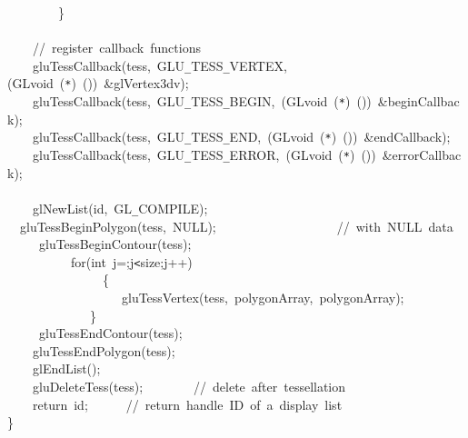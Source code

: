 {\jttstylea ~~~~~~~~\jttstylei \}\\
\jttstylea \\
\jttstylea ~~~~\jttstyled //~register~callback~functions\\
\jttstylea ~~~~\jttstylek gluTessCallback\jttstylei (\jttstylek tess,~GLU\verb#_#TESS\verb#_#VERTEX,\jttstylei (\jttstylek GLvoid~\jttstylei (\jttstylek \verb#*#\jttstylei )~())~\jttstylek \&glVertex3dv\jttstylei )\jttstylek ;\\
\jttstylea ~~~~\jttstylek gluTessCallback\jttstylei (\jttstylek tess,~GLU\verb#_#TESS\verb#_#BEGIN,~\jttstylei (\jttstylek GLvoid~\jttstylei (\jttstylek \verb#*#\jttstylei )~())~\jttstylek \&beginCallback\jttstylei )\jttstylek ;\\
\jttstylea ~~~~\jttstylek gluTessCallback\jttstylei (\jttstylek tess,~GLU\verb#_#TESS\verb#_#END,~\jttstylei (\jttstylek GLvoid~\jttstylei (\jttstylek \verb#*#\jttstylei )~())~\jttstylek \&endCallback\jttstylei )\jttstylek ;\\
\jttstylea ~~~~\jttstylek gluTessCallback\jttstylei (\jttstylek tess,~GLU\verb#_#TESS\verb#_#ERROR,~\jttstylei (\jttstylek GLvoid~\jttstylei (\jttstylek \verb#*#\jttstylei )~())~\jttstylek \&errorCallback\jttstylei )\jttstylek ;\\
\jttstylea \\
\jttstylea ~~~~\jttstylek glNewList\jttstylei (\jttstylek id,~GL\verb#_#COMPILE\jttstylei )\jttstylek ;\\
\jttstylea ~~\jttstylek gluTessBeginPolygon\jttstylei (\jttstylek tess,~NULL\jttstylei )\jttstylek ;~~~~~~~~~~~~~~~~~~~\jttstyled //~with~NULL~data\\
\jttstylea ~~~~~\jttstylek gluTessBeginContour\jttstylei (\jttstylek tess\jttstylei )\jttstylek ;\\
\jttstylea ~~~~~~~~~~\jttstylee for\jttstylei (\jttstylej int~\jttstylek j=\jttstylek ;j\verb#<#size;j++\jttstylei )\\
\jttstylea ~~~~~~~~~~~~~~~\jttstylei \{\\
\jttstylea ~~~~~~~~~~~~~~~~~~\jttstylek gluTessVertex\jttstylei (\jttstylek tess,~polygonArray\jttstylek ,~polygonArray)\jttstylek ;\\
\jttstylea ~~~~~~~~~~~~~\jttstylei \}\\
\jttstylea ~~~~~\jttstylek gluTessEndContour\jttstylei (\jttstylek tess\jttstylei )\jttstylek ;\\
\jttstylea ~~~~\jttstylek gluTessEndPolygon\jttstylei (\jttstylek tess\jttstylei )\jttstylek ;\\
\jttstylea ~~~~\jttstylek glEndList\jttstylei ()\jttstylek ;\\
\jttstylea ~~~~\jttstylek gluDeleteTess\jttstylei (\jttstylek tess\jttstylei )\jttstylek ;~~~~~~~~\jttstyled //~delete~after~tessellation\\
\jttstylea ~~~~\jttstylee return~\jttstylek id;~~~~~~\jttstyled //~return~handle~ID~of~a~display~list\\
\jttstylei \}\\

}